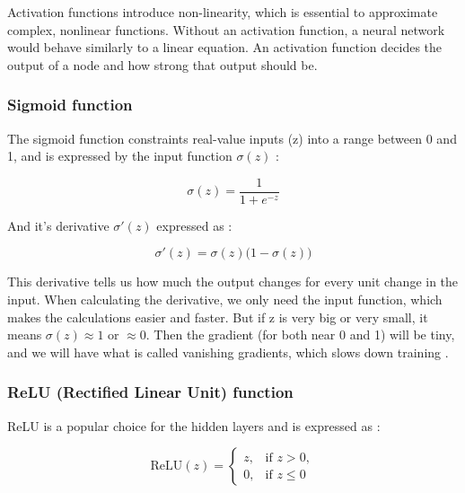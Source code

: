 \documentclass[amssymb,twocolumn,aps,floatfix]{revtex4-2}
\begin{document}
Activation functions introduce non-linearity, which is essential to approximate complex, nonlinear functions. Without an activation function, a neural network would behave similarly to a linear equation. An activation function decides the output of a node and how strong that output should be. 

\subsubsection{Sigmoid function}

The sigmoid function constraints real-value inputs (z) into a range between 0 and 1, and is expressed by the input function $\sigma(z)$ \cite{hjorthjensen_week42_misc}: 

\begin{equation}
    \sigma(z) = \frac{1}{1 + e^{-z}}
\end{equation}

And it's derivative $\sigma'(z)$ expressed as \citep[p.~205]{bishop2006pattern}:

\begin{equation}
    \sigma'(z) = \sigma(z)\bigl(1 - \sigma(z)\bigr)
\end{equation}

This derivative tells us how much the output changes for every unit change in the input. When calculating the derivative, we only need the input function, which makes the calculations easier and faster. But if z is very big or very small, it means $\sigma(z) \approx 1$ or $\approx 0$. Then the gradient (for both near 0 and 1) will be tiny, and we will have what is called vanishing gradients, which slows down training \cite{hjorthjensen_week41_misc} \cite{hjorthjensen_week42_misc}. 

\subsubsection{ReLU (Rectified Linear Unit) function}

ReLU is a popular choice for the hidden layers and is expressed as \cite{hjorthjensen_week42_misc}: 

\begin{equation}
    \text{ReLU}(z) =
\begin{cases}
z, & \text{if } z > 0,\\[6pt]
0, & \text{if } z \le 0
\end{cases}
\label{eq:relu}
\end{equation}
\end{document}
